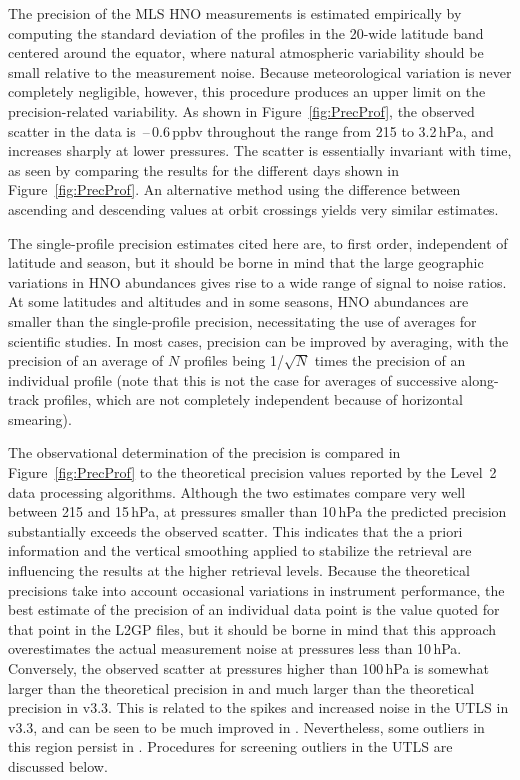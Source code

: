 \documentclass[11pt,draft]{report}
\begin{document}
The precision of the MLS HNO measurements is estimated empirically
by computing the standard deviation of the profiles in the
20\degsym-wide latitude band centered around the equator, where natural
atmospheric variability should be small relative to the measurement
noise.  Because meteorological variation is never completely negligible,
however, this procedure produces an upper limit on the precision-related
variability.  As shown in Figure~\ref{fig:PrecProf}, the observed
scatter in the \thisv data is \,--\,0.6\,ppbv throughout
the range from 215 to 3.2\,hPa, and increases sharply at lower
pressures.  The scatter is essentially invariant with time, as seen by
comparing the results for the different days shown in
Figure~\ref{fig:PrecProf}.  An alternative method using the difference
between ascending and descending values at orbit crossings yields very
similar estimates.

The single-profile precision estimates cited here are, to first order,
independent of latitude and season, but it should be borne in mind that
the large geographic variations in HNO abundances gives rise to a
wide range of signal to noise ratios.  At some latitudes and altitudes
and in some seasons, HNO abundances are smaller than the
single-profile precision, necessitating the use of averages for
scientific studies.  In most cases, precision can be improved by
averaging, with the precision of an average of $N$ profiles being
1/$\sqrt{N}$ times the precision of an individual profile (note that
this is not the case for averages of successive along-track profiles,
which are not completely independent because of horizontal smearing).

The observational determination of the precision is compared in
Figure~\ref{fig:PrecProf} to the theoretical precision values reported
by the Level~2 data processing algorithms.  Although the two estimates
compare very well between 215 and 15\,hPa, at pressures smaller than
10\,hPa the predicted precision substantially exceeds the observed
scatter.  This indicates that the a priori information and the vertical
smoothing applied to stabilize the retrieval are influencing the results
at the higher retrieval levels.  Because the theoretical precisions take
into account occasional variations in instrument performance, the best
estimate of the precision of an individual data point is the value
quoted for that point in the L2GP files, but it should be borne in mind
that this approach overestimates the actual measurement noise at
pressures less than 10\,hPa.  Conversely, the observed scatter at
pressures higher than 100\,hPa is somewhat larger than the theoretical
precision in \thisv and much larger than the theoretical precision in
v3.3.  This is related to the spikes and increased noise in the UTLS in
v3.3, and can be seen to be much improved in \thisv.  Nevertheless, some
outliers in this region persist in \thisv.  Procedures for screening
outliers in the UTLS are discussed below.
\end{document}
